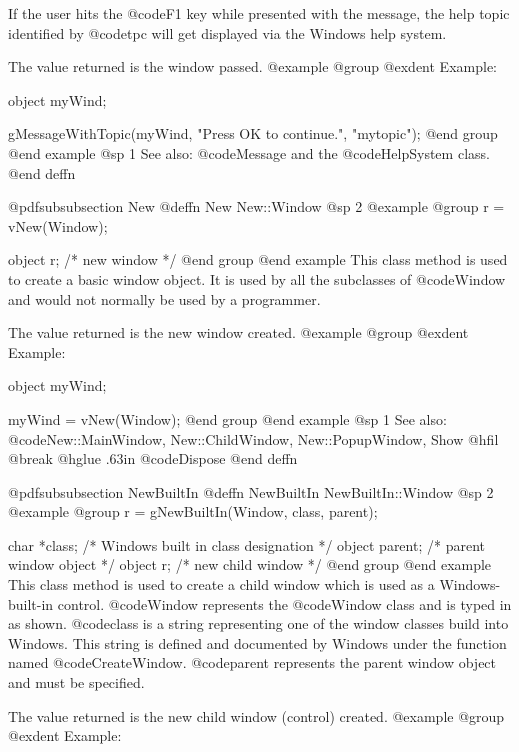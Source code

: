 If the user hits the @code{F1} key while presented with the message,
the help topic identified by @code{tpc} will get displayed via the Windows
help system.

The value returned is the window passed.
@example
@group
@exdent Example:

object  myWind;

gMessageWithTopic(myWind, "Press OK to continue.", "mytopic");
@end group
@end example
@sp 1
See also:  @code{Message} and the @code{HelpSystem} class.
@end deffn











@pdfsubsubsection {New}
@deffn {New} New::Window
@sp 2
@example
@group
r = vNew(Window);

object  r;      /*  new window  */
@end group
@end example
This class method is used to create a basic window object.  It is used
by all the subclasses of @code{Window} and would not normally be
used by a programmer.

The value returned is the new window created.
@example
@group
@exdent Example:

object  myWind;

myWind = vNew(Window);
@end group
@end example
@sp 1
See also:  @code{New::MainWindow, New::ChildWindow, New::PopupWindow, Show}
@hfil @break @hglue .63in   @code{Dispose}
@end deffn







@pdfsubsubsection {NewBuiltIn}
@deffn {NewBuiltIn} NewBuiltIn::Window
@sp 2
@example
@group
r = gNewBuiltIn(Window, class, parent);

char    *class; /*  Windows built in class designation  */
object  parent; /*  parent window object                */
object  r;      /*  new child window                    */
@end group
@end example
This class method is used to create a child window which is used as a
Windows-built-in control.  @code{Window} represents the @code{Window}
class and is typed in as shown.  @code{class} is a string representing
one of the window classes build into Windows.  This string is defined
and documented by Windows under the function named @code{CreateWindow}.
@code{parent} represents the parent window object and must be specified.

The value returned is the new child window (control) created.
@example
@group
@exdent Example:

